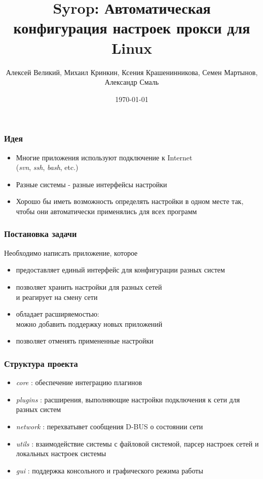 \documentclass[unicode]{beamer}
\title[Syrop]{Syrop: Автоматическая конфигурация настроек прокси для Linux}
\author{Алексей Великий, Михаил Кринкин, Ксения Крашенинникова, Семен Мартынов, Александр Смаль}
\institute[APTU]
{
Санкт-Петербугский Академический Университет
 \\
\medskip
{\emph{avsmal@gmail.com}}
}
\date{\today}
\begin{document}
%
\begin{frame}
\titlepage
\end{frame}
%
\begin{frame}
\frametitle{Идея}
\begin{itemize}
\item 
Многие приложения используют подключение к Internet \\
(\emph{svn}, \emph{ssh}, \emph{bash}, etc.)
\item
Разные системы - разные интерфейсы настройки
\item
Хорошо бы иметь возможность определять настройки в одном
месте так, чтобы они автоматически применялись для
всех программ
\end{itemize}
\end{frame}

\begin{frame}
\frametitle{Постановка задачи}
Необходимо написать приложение, которое
\begin{itemize}
\item предоставляет единый интерфейс для  конфигурации разных систем
\item позволяет хранить настройки для разных сетей \\
и реагирует на смену сети
\item обладает расширяемостью: \\
можно добавить поддержку новых приложений
\item позволяет отменять примененные настройки

\end{itemize}
\end{frame}

\begin{frame}
\frametitle{Структура проекта}
\begin{itemize}
\item \emph{core} :  обеспечение интеграцию плагинов
\item \emph{plugins} :  расширения, выполняющие настройки подключения к сети для разных систем
\item \emph{network} : перехватывет сообщения D-BUS о состоянии сети
\item \emph{utils} : взаимодействие системы с файловой системой, 
парсер настроек сетей и локальных настроек системы
\item \emph{gui} : поддержка консольного и графического режима работы
\end{itemize}
\end{frame}
%
\end{document}
